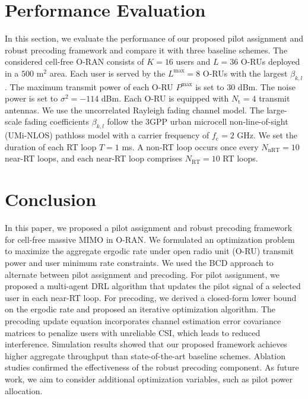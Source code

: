 \documentclass[10pt, conference]{IEEEtran}
\begin{document}
\section{Performance Evaluation} \label{sec:sim}
In this section, we evaluate the performance of our proposed pilot assignment and robust precoding framework and compare it with three baseline schemes.
The considered cell-free O-RAN consists of $K=16$ users and $L=36$ O-RUs deployed in a $500 \textrm{ m}^2$ area. 
Each user is served by the $L^\textrm{max}=8$ O-RUs with the largest $\beta_{k,l}$.
The maximum transmit power of each O-RU $P^{\textrm{max}}$ is set to $30$ dBm.
The noise power is set to $\sigma^2= -114$ dBm.
Each O-RU is equipped with $N_{\textrm{t}}=4$ transmit antennas.
We use the uncorrelated Rayleigh fading channel model.
The large-scale fading coefficients $\beta_{k,l}$ follow the 3GPP urban microcell non-line-of-sight (UMi-NLOS) pathloss model \cite{3GPP_pathloss} with a carrier frequency of $f_\textrm{c}=2 \textrm{ GHz}$.
We set the duration of each RT loop $T=1$ ms. A non-RT loop occurs once every $N_\textrm{nRT}=10$ near-RT loops, and each near-RT loop comprises $N_\textrm{RT}=10$ RT loops.

\section{Conclusion} \label{sec:conclusion}
In this paper, we proposed a pilot assignment and robust precoding framework for cell-free massive MIMO in O-RAN. We formulated an optimization problem to maximize the aggregate ergodic rate under open radio unit (O-RU) transmit power and user minimum rate constraints. We used the BCD approach to alternate between pilot assignment and precoding. 
For pilot assignment, we proposed a multi-agent DRL algorithm that updates the pilot signal of a selected user in each near-RT loop. 
For precoding, we derived a closed-form lower bound on the ergodic rate and proposed an iterative optimization algorithm.
The precoding update equation incorporates channel estimation error covariance matrices to penalize users with unreliable CSI, which leads to reduced interference. 
Simulation results showed that our proposed framework achieves higher aggregate throughput than state-of-the-art baseline schemes. Ablation studies confirmed the effectiveness of the robust precoding component.
As future work, we aim to consider additional optimization variables, such as pilot power allocation.

\appendices
\end{document}
